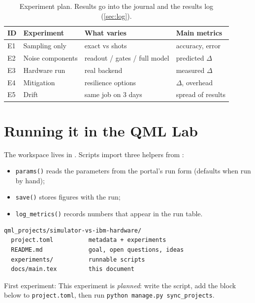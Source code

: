 \documentclass[11pt,a4paper]{article}
\begin{document}
\begin{table}[h]
\centering\small
\begin{tabularx}{\linewidth}{@{}l>{\raggedright}X>{\raggedright}X>{\raggedright\arraybackslash}X@{}}
\toprule
ID & Experiment & What varies & Main metrics \\
\midrule
  E1 & Sampling only & exact vs shots & accuracy, error \\
  E2 & Noise components & readout / gates / full model & predicted $\Delta$ \\
  E3 & Hardware run & real backend & measured $\Delta$ \\
  E4 & Mitigation & resilience options & $\Delta$, overhead \\
  E5 & Drift & same job on 3 days & spread of results \\
\bottomrule
\end{tabularx}
\caption{Experiment plan. Results go into the journal and the results log (\cref{sec:log}).}
\end{table}

\section{Running it in the QML Lab}
The workspace lives in . Scripts import three helpers from
:
\begin{itemize}
  \item \texttt{params()} reads the parameters from the portal's run form (defaults when run by hand);
  \item \texttt{save()} stores figures with the run;
  \item \texttt{log\_metrics()} records numbers that appear in the run table.
\end{itemize}

\begin{lstlisting}
qml_projects/simulator-vs-ibm-hardware/
  project.toml          metadata + experiments
  README.md             goal, open questions, ideas
  experiments/          runnable scripts
  docs/main.tex         this document
\end{lstlisting}

First experiment: This experiment is \emph{planned}: write the script, add the block below to \texttt{project.toml}, then run \texttt{python manage.py sync\_projects}.
\end{document}
